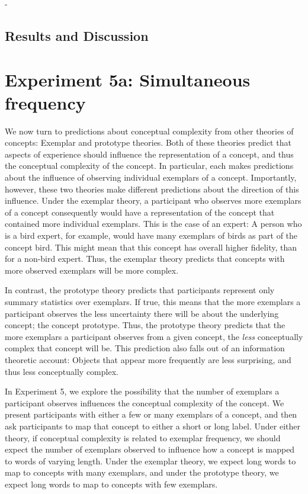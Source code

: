 - 


\subsection{Results and Discussion}

\section{Experiment 5a: Simultaneous frequency}
We now turn to predictions about conceptual complexity from other theories of concepts: Exemplar and prototype theories. Both of these theories predict that aspects of experience should influence the representation of a concept, and thus the conceptual complexity of the concept. In particular, each makes predictions about the influence of observing individual exemplars of a concept.  Importantly, however, these two theories make different predictions about the direction of this influence. Under the exemplar theory, a participant who observes more exemplars of a concept consequently would have a representation of the concept that contained more individual exemplars. This is the case of an expert: A person who is a bird expert, for example, would have many exemplars of birds as part of the concept bird. This might mean that this concept has overall higher fidelity, than for a non-bird expert. Thus, the exemplar theory predicts that concepts with more observed exemplars will be more complex.

In contrast, the prototype theory predicts that participants represent only summary statistics over exemplars. If true, this means that the more exemplars a participant observes the less uncertainty there will be about the underlying concept; the concept prototype. Thus, the prototype theory predicts that the more exemplars a participant observes from a given concept, the {\it less} conceptually complex that concept will be. This prediction also falls out of an information theoretic account: Objects that appear more frequently are less surprising, and thus less conceptually complex.

In Experiment 5, we explore the possibility that the number of exemplars a participant observes influences the conceptual complexity of the concept. We present participants with either a few or many exemplars of a concept, and then ask participants to map that concept to either a short or long label. Under either theory, if conceptual complexity is related to exemplar frequency, we should expect the number of exemplars observed to influence how a concept is mapped to words of varying length. Under the exemplar theory, we expect long words to map to concepts with many exemplars, and under the prototype theory, we expect long words to map to concepts with few exemplars.

